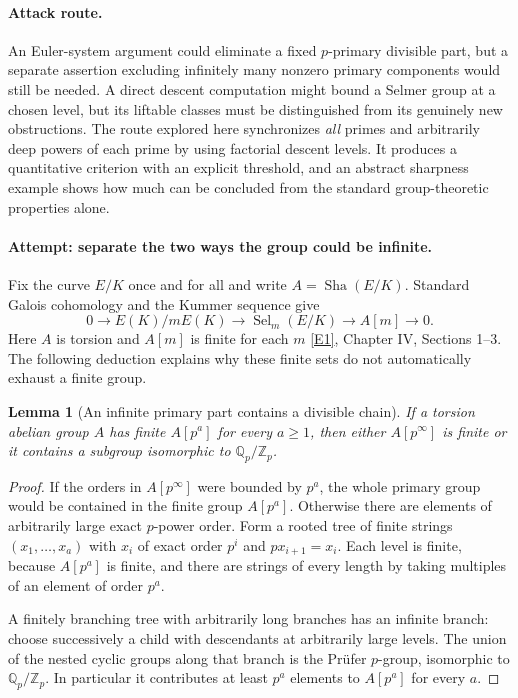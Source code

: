 \documentclass[11pt,a4paper]{article}
\newcommand{\Z}{\mathbb{Z}}
\newcommand{\Q}{\mathbb{Q}}
\newcommand{\eref}[2]{\hyperlink{extra:#1:#2}{[E#2]}}
\newtheorem{notebooklemma}{Lemma}[section]
\numberwithin{equation}{section}
\begin{document}
\paragraph{Attack route.}
An Euler-system argument could eliminate a fixed $p$-primary divisible part, but a separate assertion excluding infinitely many nonzero primary components would still be needed. A direct descent computation might bound a Selmer group at a chosen level, but its liftable classes must be distinguished from its genuinely new obstructions. The route explored here synchronizes \emph{all} primes and arbitrarily deep powers of each prime by using factorial descent levels. It produces a quantitative criterion with an explicit threshold, and an abstract sharpness example shows how much can be concluded from the standard group-theoretic properties alone.

\paragraph{Attempt: separate the two ways the group could be infinite.}
Fix the curve $E/K$ once and for all and write $A=\operatorname{Sha}(E/K)$. Standard Galois cohomology and the Kummer sequence give
\begin{equation}\label{r59:kummer}
 0\longrightarrow E(K)/mE(K)\longrightarrow
       \operatorname{Sel}_m(E/K)\longrightarrow A[m]\longrightarrow0.
\end{equation}
Here $A$ is torsion and $A[m]$ is finite for each $m$ \eref{statement}{1}, Chapter IV, Sections 1--3. The following deduction explains why these finite sets do not automatically exhaust a finite group.

\begin{notebooklemma}[An infinite primary part contains a divisible chain]\label{r59:prufer}
If a torsion abelian group $A$ has finite $A[p^a]$ for every $a\geq1$, then either $A[p^\infty]$ is finite or it contains a subgroup isomorphic to $\Q_p/\Z_p$.
\end{notebooklemma}
\begin{proof}
If the orders in $A[p^\infty]$ were bounded by $p^a$, the whole primary group would be contained in the finite group $A[p^a]$. Otherwise there are elements of arbitrarily large exact $p$-power order. Form a rooted tree of finite strings $(x_1,\ldots,x_a)$ with $x_i$ of exact order $p^i$ and $px_{i+1}=x_i$. Each level is finite, because $A[p^a]$ is finite, and there are strings of every length by taking multiples of an element of order $p^a$.

A finitely branching tree with arbitrarily long branches has an infinite branch: choose successively a child with descendants at arbitrarily large levels. The union of the nested cyclic groups along that branch is the Pr\"ufer $p$-group, isomorphic to $\Q_p/\Z_p$. In particular it contributes at least $p^a$ elements to $A[p^a]$ for every $a$.
\end{proof}
\end{document}
